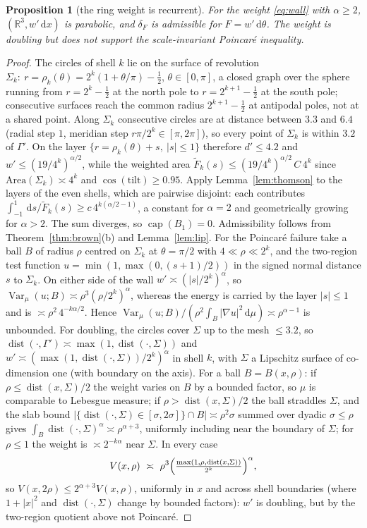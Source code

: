 \documentclass[11pt]{amsart}
\newcommand{\R}{\mathbb{R}}
\newcommand{\dd}{\,\mathrm{d}}
\newcommand{\abs}[1]{\lvert #1\rvert}
\DeclareMathOperator{\capa}{cap}
\DeclareMathOperator{\dist}{dist}
\DeclareMathOperator{\Var}{Var}
\theoremstyle{plain}
\newtheorem{proposition}[theorem]{Proposition}
\theoremstyle{definition}
\theoremstyle{remark}
\begin{document}
\begin{proposition}[the ring weight is recurrent]\label{prop:wall}
For the weight \eqref{eq:wall} with $\alpha\ge2$, $(\R^3,w'\dd x)$ is parabolic,
and $\delta_F$ is admissible for $F=w'\dd\theta$. The weight is doubling but does
not support the scale-invariant Poincar\'e inequality.
\end{proposition}

\begin{proof}
The circles of shell $k$ lie on the surface of revolution
$\Sigma_k:\ r=\rho_k(\theta)=2^k(1+\theta/\pi)-\tfrac12$, $\theta\in[0,\pi]$, a
closed graph over the sphere running from $r=2^k-\frac12$ at the north pole to
$r=2^{k+1}-\frac12$ at the south pole; consecutive surfaces reach the common
radius $2^{k+1}-\frac12$ at antipodal poles, not at a shared point. Along
$\Sigma_k$ consecutive circles are at distance between $3.3$ and $6.4$ (radial
step $1$, meridian step $r\pi/2^k\in[\pi,2\pi]$), so every point of $\Sigma_k$ is
within $3.2$ of $\Gamma'$. On the layer $\{r=\rho_k(\theta)+s,\ \abs s\le1\}$
therefore $d'\le4.2$ and $w'\le(19/4^k)^{\alpha/2}$, while the weighted area
$\tilde F_k(s)\le(19/4^k)^{\alpha/2}\,C\,4^k$ since $\mathrm{Area}(\Sigma_k)\asymp4^k$
and $\cos(\mathrm{tilt})\ge0.95$. Apply Lemma~\ref{lem:thomson} to the layers of
the even shells, which are pairwise disjoint: each contributes
$\int_{-1}^1\dd s/\tilde F_k(s)\ge c\,4^{k(\alpha/2-1)}$, a constant for $\alpha=2$
and geometrically growing for $\alpha>2$. The sum diverges, so $\capa(B_1)=0$.
Admissibility follows from Theorem~\ref{thm:brown}(b) and Lemma~\ref{lem:lip}.
For the Poincar\'e failure take a ball $B$ of radius $\rho$ centred on
$\Sigma_k$ at $\theta=\pi/2$ with $4\ll\rho\ll2^k$, and the two-region test
function $u=\min(1,\max(0,(s+1)/2))$ in the signed normal distance $s$ to
$\Sigma_k$. On either side of the wall $w'\asymp(\abs s/2^k)^\alpha$, so
$\Var_\mu(u;B)\asymp\rho^3(\rho/2^k)^\alpha$, whereas the energy is carried by
the layer $\abs s\le1$ and is $\asymp\rho^2\,4^{-k\alpha/2}$. Hence
$\Var_\mu(u;B)/(\rho^2\int_B\abs{\nabla u}^2\dd\mu)\asymp\rho^{\alpha-1}$ is
unbounded. For doubling, the circles cover $\Sigma$ up to the mesh $\le3.2$, so
$\dist(\cdot,\Gamma')\asymp\max(1,\dist(\cdot,\Sigma))$ and
$w'\asymp(\max(1,\dist(\cdot,\Sigma))/2^k)^\alpha$ in shell $k$, with $\Sigma$ a
Lipschitz surface of co-dimension one (with boundary on the axis). For a ball
$B=B(x,\rho)$: if $\rho\le\dist(x,\Sigma)/2$ the weight varies on $B$ by a
bounded factor, so $\mu$ is comparable to Lebesgue measure; if
$\rho>\dist(x,\Sigma)/2$ the ball straddles $\Sigma$, and the slab bound
$\abs{\{\dist(\cdot,\Sigma)\in[\sigma,2\sigma]\}\cap B}\asymp\rho^2\sigma$ summed
over dyadic $\sigma\le\rho$ gives $\int_B\dist(\cdot,\Sigma)^\alpha\asymp
\rho^{\alpha+3}$, uniformly including near the boundary of $\Sigma$; for
$\rho\le1$ the weight is $\asymp2^{-k\alpha}$ near $\Sigma$. In every case
\[
V(x,\rho)\ \asymp\ \rho^3\Bigl(\tfrac{\max(1,\rho,\dist(x,\Sigma))}{2^k}\Bigr)^\alpha,
\]
so $V(x,2\rho)\le2^{\alpha+3}V(x,\rho)$, uniformly in $x$ and across shell
boundaries (where $1+\abs x^2$ and $\dist(\cdot,\Sigma)$ change by bounded
factors): $w'$ is doubling, but by the two-region quotient above not Poincar\'e.
\end{proof}
\end{document}
